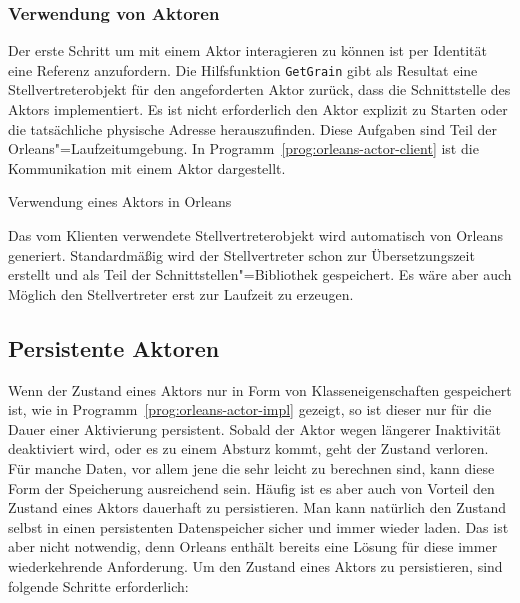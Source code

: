 \subsubsection{Verwendung von Aktoren}

Der erste Schritt um mit einem Aktor interagieren zu können ist per Identität eine Referenz anzufordern. Die Hilfsfunktion \lstinline{GetGrain} gibt als Resultat eine Stellvertreterobjekt für den angeforderten Aktor zurück, dass die Schnittstelle des Aktors implementiert. Es ist nicht erforderlich den Aktor explizit zu Starten oder die tatsächliche physische Adresse herauszufinden. Diese Aufgaben sind Teil der Orleans"=Laufzeitumgebung. In Programm~\ref{prog:orleans-actor-client} ist die Kommunikation mit einem Aktor dargestellt.

\begin{program}[!hbt]
\caption{Verwendung eines Aktors in Orleans}
\label{prog:orleans-actor-client}
\end{program}

\iffalse $ \fi

Das vom Klienten verwendete Stellvertreterobjekt wird automatisch von Orleans generiert. Standardmäßig wird der Stellvertreter schon zur Übersetzungszeit erstellt und als Teil der Schnittstellen"=Bibliothek gespeichert. Es wäre aber auch Möglich den Stellvertreter erst zur Laufzeit zu erzeugen.

\subsection{Persistente Aktoren}

Wenn der Zustand eines Aktors nur in Form von Klasseneigenschaften gespeichert ist, wie in Programm~\ref{prog:orleans-actor-impl} gezeigt, so ist dieser nur für die Dauer einer Aktivierung persistent. Sobald der Aktor wegen längerer Inaktivität deaktiviert wird, oder es zu einem Absturz kommt, geht der Zustand verloren. Für manche Daten, vor allem jene die sehr leicht zu berechnen sind, kann diese Form der Speicherung ausreichend sein. Häufig ist es aber auch von Vorteil den Zustand eines Aktors dauerhaft zu persistieren. Man kann natürlich den Zustand selbst in einen persistenten Datenspeicher sicher und immer wieder laden. Das ist aber nicht notwendig, denn Orleans enthält bereits eine Lösung für diese immer wiederkehrende Anforderung. Um den Zustand eines Aktors zu persistieren, sind folgende Schritte erforderlich:

